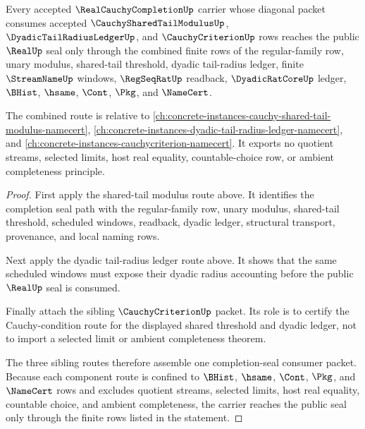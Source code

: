 \begin{theorem}
\label{thm:real-cauchy-completion-cauchycriterion-sibling-route}
Every accepted $\RealCauchyCompletionUp$ carrier whose diagonal packet consumes accepted $\CauchySharedTailModulusUp$, $\DyadicTailRadiusLedgerUp$, and $\CauchyCriterionUp$ rows reaches the public $\RealUp$ seal only through the combined finite rows of the regular-family row, unary modulus, shared-tail threshold, dyadic tail-radius ledger, finite $\StreamNameUp$ windows, $\RegSeqRatUp$ readback, $\DyadicRatCoreUp$ ledger, $\BHist$, $\hsame$, $\Cont$, $\Pkg$, and $\NameCert$.

The combined route is relative to \autoref{ch:concrete-instances-cauchy-shared-tail-modulus-namecert}, \autoref{ch:concrete-instances-dyadic-tail-radius-ledger-namecert}, and \autoref{ch:concrete-instances-cauchycriterion-namecert}. It exports no quotient streams, selected limits, host real equality, countable-choice row, or ambient completeness principle.
\end{theorem}
\begin{proof}
First apply the shared-tail modulus route above. It identifies the completion seal path with the regular-family row, unary modulus, shared-tail threshold, scheduled windows, readback, dyadic ledger, structural transport, provenance, and local naming rows.

Next apply the dyadic tail-radius ledger route above. It shows that the same scheduled windows must expose their dyadic radius accounting before the public $\RealUp$ seal is consumed.

Finally attach the sibling $\CauchyCriterionUp$ packet. Its role is to certify the Cauchy-condition route for the displayed shared threshold and dyadic ledger, not to import a selected limit or ambient completeness theorem.

The three sibling routes therefore assemble one completion-seal consumer packet. Because each component route is confined to $\BHist$, $\hsame$, $\Cont$, $\Pkg$, and $\NameCert$ rows and excludes quotient streams, selected limits, host real equality, countable choice, and ambient completeness, the carrier reaches the public seal only through the finite rows listed in the statement.
\end{proof}

